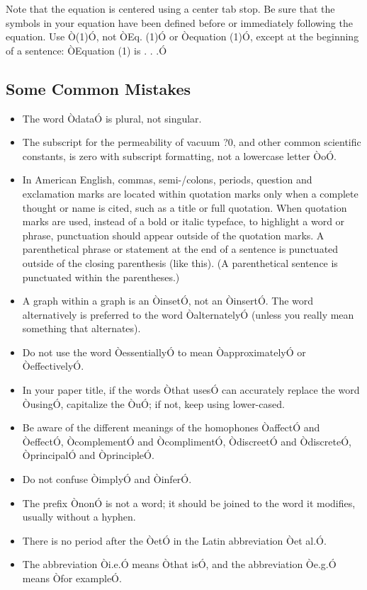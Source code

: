 \documentclass[letterpaper, 10 pt, conference]{ieeeconf}  %
\begin{document}
Note that the equation is centered using a center tab stop. Be sure that the symbols in your equation have been defined before or immediately following the equation. Use Ò(1)Ó, not ÒEq. (1)Ó or Òequation (1)Ó, except at the beginning of a sentence: ÒEquation (1) is . . .Ó

\subsection{Some Common Mistakes}
\begin{itemize}


\item The word ÒdataÓ is plural, not singular.
\item The subscript for the permeability of vacuum ?0, and other common scientific constants, is zero with subscript formatting, not a lowercase letter ÒoÓ.
\item In American English, commas, semi-/colons, periods, question and exclamation marks are located within quotation marks only when a complete thought or name is cited, such as a title or full quotation. When quotation marks are used, instead of a bold or italic typeface, to highlight a word or phrase, punctuation should appear outside of the quotation marks. A parenthetical phrase or statement at the end of a sentence is punctuated outside of the closing parenthesis (like this). (A parenthetical sentence is punctuated within the parentheses.)
\item A graph within a graph is an ÒinsetÓ, not an ÒinsertÓ. The word alternatively is preferred to the word ÒalternatelyÓ (unless you really mean something that alternates).
\item Do not use the word ÒessentiallyÓ to mean ÒapproximatelyÓ or ÒeffectivelyÓ.
\item In your paper title, if the words Òthat usesÓ can accurately replace the word ÒusingÓ, capitalize the ÒuÓ; if not, keep using lower-cased.
\item Be aware of the different meanings of the homophones ÒaffectÓ and ÒeffectÓ, ÒcomplementÓ and ÒcomplimentÓ, ÒdiscreetÓ and ÒdiscreteÓ, ÒprincipalÓ and ÒprincipleÓ.
\item Do not confuse ÒimplyÓ and ÒinferÓ.
\item The prefix ÒnonÓ is not a word; it should be joined to the word it modifies, usually without a hyphen.
\item There is no period after the ÒetÓ in the Latin abbreviation Òet al.Ó.
\item The abbreviation Òi.e.Ó means Òthat isÓ, and the abbreviation Òe.g.Ó means Òfor exampleÓ.

\end{itemize}
\end{document}
